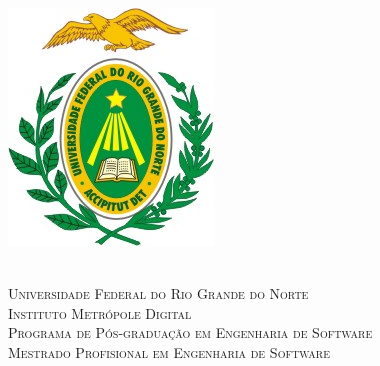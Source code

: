 
\begin{titlepage}
	\begin{center}
		\begin{minipage}{2.2cm}
			\begin{center}
				\includegraphics[scale=1.2]{Imagens/Brasao-UFRN.jpg}
			\end{center}
		\end{minipage}
		\begin{minipage}{10.15cm}
			\begin{center}
				\begin{espacosimples}
					{\small \ \\
                       \textsc{Universidade Federal do Rio Grande do Norte}		   			\\
							  \textsc{Instituto Metrópole Digital}					\\
							  \textsc{Programa de Pós-graduação em Engenharia de Software}	\\
                       \textsc{Mestrado Profisional em Engenharia de Software}}   				\\
				\end{espacosimples}
			\end{center}
		\end{minipage}
		\begin{minipage}{2.2cm}
			\begin{center}

\end{center}
\end{minipage}
\end{center}
\end{titlepage}
